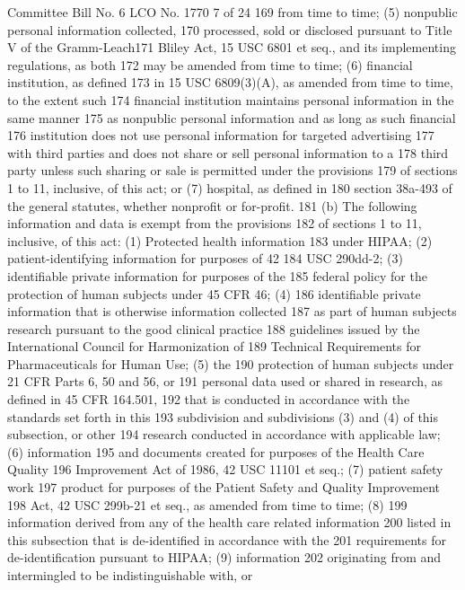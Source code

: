 Committee Bill No. 6
LCO No. 1770 7 of 24
169 from time to time; (5) nonpublic personal information collected,
170 processed, sold or disclosed pursuant to Title V of the Gramm-Leach171 Bliley Act, 15 USC 6801 et seq., and its implementing regulations, as both
172 may be amended from time to time; (6) financial institution, as defined
173 in 15 USC 6809(3)(A), as amended from time to time, to the extent such
174 financial institution maintains personal information in the same manner
175 as nonpublic personal information and as long as such financial
176 institution does not use personal information for targeted advertising
177 with third parties and does not share or sell personal information to a
178 third party unless such sharing or sale is permitted under the provisions
179 of sections 1 to 11, inclusive, of this act; or (7) hospital, as defined in
180 section 38a-493 of the general statutes, whether nonprofit or for-profit.
181 (b) The following information and data is exempt from the provisions
182 of sections 1 to 11, inclusive, of this act: (1) Protected health information
183 under HIPAA; (2) patient-identifying information for purposes of 42
184 USC 290dd-2; (3) identifiable private information for purposes of the
185 federal policy for the protection of human subjects under 45 CFR 46; (4)
186 identifiable private information that is otherwise information collected
187 as part of human subjects research pursuant to the good clinical practice
188 guidelines issued by the International Council for Harmonization of
189 Technical Requirements for Pharmaceuticals for Human Use; (5) the
190 protection of human subjects under 21 CFR Parts 6, 50 and 56, or
191 personal data used or shared in research, as defined in 45 CFR 164.501,
192 that is conducted in accordance with the standards set forth in this
193 subdivision and subdivisions (3) and (4) of this subsection, or other
194 research conducted in accordance with applicable law; (6) information
195 and documents created for purposes of the Health Care Quality
196 Improvement Act of 1986, 42 USC 11101 et seq.; (7) patient safety work
197 product for purposes of the Patient Safety and Quality Improvement
198 Act, 42 USC 299b-21 et seq., as amended from time to time; (8)
199 information derived from any of the health care related information
200 listed in this subsection that is de-identified in accordance with the
201 requirements for de-identification pursuant to HIPAA; (9) information
202 originating from and intermingled to be indistinguishable with, or 

